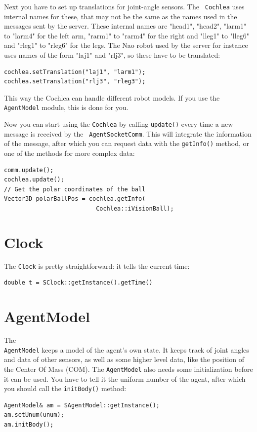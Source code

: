 Next you have to set up translations for joint-angle sensors. The {\tt
  Cochlea} uses internal names for these, that may not be the same as
the names used in the messages sent by the server. These internal
names are "head1", "head2", "larm1" to "larm4" for the left arm,
"rarm1" to "rarm4" for the right and "lleg1" to "lleg6" and "rleg1" to
"rleg6" for the legs. The Nao robot used by the server for instance
uses names of the form "laj1" and "rlj3", so these have to be
translated:
\begin{lstlisting}[frame=single]
cochlea.setTranslation("laj1", "larm1");
cochlea.setTranslation("rlj3", "rleg3");
\end{lstlisting}
This way the Cochlea can handle different robot models. If you use the
{\tt AgentModel} module, this is done for you.

Now you can start using the {\tt Cochlea} by calling {\tt update()}
every time a new message is received by the {\tt
  AgentSocketComm}. This will integrate the information of the
message, after which you can request data with the {\tt getInfo()}
method, or one of the methods for more complex data:
\begin{lstlisting}[frame=single]
comm.update();
cochlea.update();
// Get the polar coordinates of the ball
Vector3D polarBallPos = cochlea.getInfo(
                          Cochlea::iVisionBall);
\end{lstlisting}

\section{Clock}
\label{secClock}

The {\tt Clock} is pretty straightforward: it tells the current time:
\begin{lstlisting}[frame=single]
double t = SClock::getInstance().getTime()
\end{lstlisting}

\section{AgentModel}
\label{secAgentModel}

The \\{\tt AgentModel} keeps a model of the agent's own state. It
keeps track of joint angles and data of other sensors, as well as some
higher level data, like the position of the Center Of Mass (COM). The
{\tt AgentModel} also needs some initialization before it can be
used. You have to tell it the uniform number of the agent, after which
you should call the {\tt initBody()} method:
\begin{lstlisting}[frame=single]
AgentModel& am = SAgentModel::getInstance();
am.setUnum(unum);
am.initBody();
\end{lstlisting}


